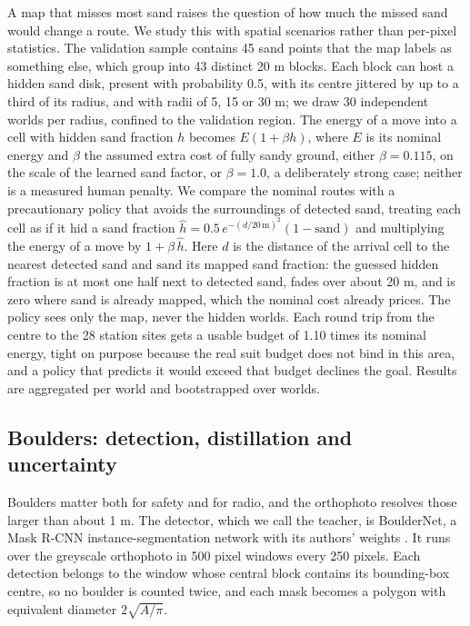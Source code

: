 \documentclass[11pt,a4paper]{article}
\begin{document}
A map that misses most sand raises the question of how much the missed sand would change a route. We study this with spatial scenarios rather than per-pixel statistics. The validation sample contains 45 sand points that the map labels as something else, which group into 43 distinct 20 m blocks. Each block can host a hidden sand disk, present with probability 0.5, with its centre jittered by up to a third of its radius, and with radii of 5, 15 or 30 m; we draw 30 independent worlds per radius, confined to the validation region. The energy of a move into a cell with hidden sand fraction $h$ becomes $E(1 + \beta h)$, where $E$ is its nominal energy and $\beta$ the assumed extra cost of fully sandy ground, either $\beta = 0.115$, on the scale of the learned sand factor, or $\beta = 1.0$, a deliberately strong case; neither is a measured human penalty. We compare the nominal routes with a precautionary policy that avoids the surroundings of detected sand, treating each cell as if it hid a sand fraction $\hat h = 0.5\,e^{-(d/20\,\text{m})^2}(1 - \text{sand})$ and multiplying the energy of a move by $1 + \beta\,\hat h$. Here $d$ is the distance of the arrival cell to the nearest detected sand and $\text{sand}$ its mapped sand fraction: the guessed hidden fraction is at most one half next to detected sand, fades over about 20 m, and is zero where sand is already mapped, which the nominal cost already prices. The policy sees only the map, never the hidden worlds. Each round trip from the centre to the 28 station sites gets a usable budget of 1.10 times its nominal energy, tight on purpose because the real suit budget does not bind in this area, and a policy that predicts it would exceed that budget declines the goal. Results are aggregated per world and bootstrapped over worlds.

\subsection{Boulders: detection, distillation and uncertainty}

Boulders matter both for safety and for radio, and the orthophoto resolves those larger than about 1 m. The detector, which we call the teacher, is BoulderNet, a Mask R-CNN instance-segmentation network \cite{He2017,Wu2019} with its authors' weights \cite{Prieur2023}. It runs over the greyscale orthophoto in 500 pixel windows every 250 pixels. Each detection belongs to the window whose central block contains its bounding-box centre, so no boulder is counted twice, and each mask becomes a polygon with equivalent diameter $2\sqrt{A/\pi}$.
\end{document}
